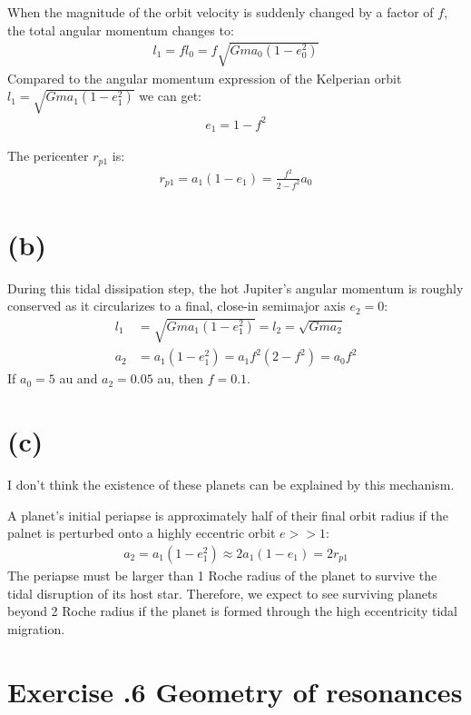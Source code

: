 \documentclass[a4paper,12pt]{article}
\begin{document}
When the magnitude of the orbit velocity is suddenly changed by a factor of $f$, the total angular momentum changes to:
\begin{align*}
    l_1 = fl_0 = f\sqrt{Gma_0(1-e_0^2)}
\end{align*}
Compared to the angular momentum expression of the Kelperian orbit $l_1 = \sqrt{Gma_1(1-e_1^2)}$ we can get:
\begin{align*}
    e_1 = 1 - f^2
\end{align*}

The pericenter $r_{p1}$ is:
\begin{align*}
    r_{p1} = a_1 (1 - e_1) = \frac{f^2}{2 - f^2} a_0
\end{align*}

\section*{(b)}
During this tidal dissipation step, the hot Jupiter's angular momentum is roughly conserved as it circularizes to a final, close-in
semimajor axis $e_2=0$:
\begin{align*}
    l_1 &= \sqrt{Gma_1(1-e_1^2)} = l_2 = \sqrt{Gma_2} \\
    a_2 &= a_1 (1-e_1^2) = a_1 f^2 (2 - f^2) = a_0 f^2
\end{align*}
If $a_0 = 5$ au and $a_2 = 0.05$ au, then $f = 0.1$.

\section*{(c)}
I don't think the existence of these planets can be explained by this mechanism.

A planet's initial periapse is approximately half of their final orbit 
radius if the palnet is perturbed onto a highly eccentric orbit $e>>1$:
\begin{align*}
    a_2 = a_1(1-e_1^2) \approx 2a_1(1-e_1) = 2 r_{p1} 
\end{align*}
The periapse must be larger than 1 Roche radius of the planet to survive the tidal 
disruption of its host star. Therefore, we expect to see surviving planets beyond 
2 Roche radius if the planet is formed through the high eccentricity tidal migration.


\section*{\textbf{Exercise \uppercase\expandafter{}.6 Geometry of resonances}}
\end{document}
